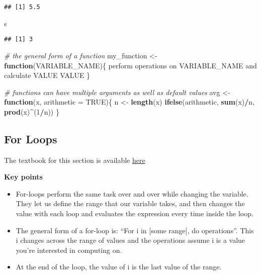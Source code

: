 \documentclass[]{article}
\newenvironment{Shaded}{\begin{snugshade}}{\end{snugshade}}
\newcommand{\CommentTok}[1]{\textcolor[rgb]{0.56,0.35,0.01}{\textit{#1}}}
\newcommand{\ControlFlowTok}[1]{\textcolor[rgb]{0.13,0.29,0.53}{\textbf{#1}}}
\newcommand{\DataTypeTok}[1]{\textcolor[rgb]{0.13,0.29,0.53}{#1}}
\newcommand{\DecValTok}[1]{\textcolor[rgb]{0.00,0.00,0.81}{#1}}
\newcommand{\KeywordTok}[1]{\textcolor[rgb]{0.13,0.29,0.53}{\textbf{#1}}}
\newcommand{\NormalTok}[1]{#1}
\newcommand{\OperatorTok}[1]{\textcolor[rgb]{0.81,0.36,0.00}{\textbf{#1}}}
\newcommand{\OtherTok}[1]{\textcolor[rgb]{0.56,0.35,0.01}{#1}}
\newcommand{\StringTok}[1]{\textcolor[rgb]{0.31,0.60,0.02}{#1}}
\providecommand{\tightlist}{%
  \setlength{\itemsep}{0pt}\setlength{\parskip}{0pt}}
\begin{document}
\begin{verbatim}
## [1] 5.5
\end{verbatim}

\begin{Shaded}
\begin{Highlighting}[]
\NormalTok{s}
\end{Highlighting}
\end{Shaded}

\begin{verbatim}
## [1] 3
\end{verbatim}

\begin{Shaded}
\begin{Highlighting}[]
\CommentTok{# the general form of a function}
\NormalTok{my_function <-}\StringTok{ }\ControlFlowTok{function}\NormalTok{(VARIABLE_NAME)\{}
\NormalTok{  perform operations on VARIABLE_NAME and calculate VALUE}
\NormalTok{  VALUE}
\NormalTok{\}}
\end{Highlighting}
\end{Shaded}

\begin{Shaded}
\begin{Highlighting}[]
\CommentTok{# functions can have multiple arguments as well as default values}
\NormalTok{avg <-}\StringTok{ }\ControlFlowTok{function}\NormalTok{(x, }\DataTypeTok{arithmetic =} \OtherTok{TRUE}\NormalTok{)\{}
\NormalTok{  n <-}\StringTok{ }\KeywordTok{length}\NormalTok{(x)}
  \KeywordTok{ifelse}\NormalTok{(arithmetic, }\KeywordTok{sum}\NormalTok{(x)}\OperatorTok{/}\NormalTok{n, }\KeywordTok{prod}\NormalTok{(x)}\OperatorTok{^}\NormalTok{(}\DecValTok{1}\OperatorTok{/}\NormalTok{n))}
\NormalTok{\}}
\end{Highlighting}
\end{Shaded}

\hypertarget{for-loops}{%
\subsection{For Loops}\label{for-loops}}

The textbook for this section is available
\href{https://rafalab.github.io/dsbook/programming-basics.html\#for-loops}{here}

\textbf{Key points}

\begin{itemize}
\tightlist
\item
  For-loops perform the same task over and over while changing the
  variable. They let us define the range that our variable takes, and
  then changes the value with each loop and evaluates the expression
  every time inside the loop.
\item
  The general form of a for-loop is: ``For i in {[}some range{]}, do
  operations''. This i changes across the range of values and the
  operations assume i is a value you're interested in computing on.
\item
  At the end of the loop, the value of i is the last value of the range.
\end{itemize}
\end{document}

